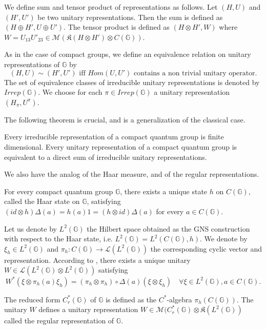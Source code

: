 We define sum and tensor product of representations as follows. Let $(H,U)$ and $(H',U')$ be two unitary representations. Then the sum is defined as $(H\oplus H', U\oplus U')$. The tensor product is defined as $(H\otimes H',W)$ where $W = U_{13} U'_{23}\in \mathcal M(\mathfrak K(H\otimes H')\otimes C(\mathbb G))$. 

\begin{definition}
As in the case of compact groups, we define an equivalence relation on unitary representations of $\mathbb G$ by 
\[(H,U)\sim (H',U') \text{ iff } Hom(U,U') \text{ contains a non trivial unitary operator}.\]
The set of equivalence classes of irreducible unitary representations is denoted by $Irrep(\mathbb G)$. We choose for each $\pi\in Irrep (\mathbb G)$ a unitary representation $(H_\pi, U^{\pi})$. 
\end{definition}

The following theorem is crucial, and is a generalization of the classical case. 

\begin{thm} Every irreducible representation of a compact quantum group is finite dimensional. Every unitary representation of a compact quantum group is equivalent to a direct sum of irreducible unitary representations. 
\end{thm}
 
We also have the analog of the Haar measure, and of the regular representations.

\begin{prop}
For every compact quantum group $\mathbb G$, there exists a unique state $h$ on $C(\mathbb G)$, called the Haar state on $\mathbb G$, satisfying $(id\otimes h)\Delta(a) = h(a)1 = (h\otimes id)\Delta(a)$ for every $a\in C(\mathbb G)$. 
\end{prop}

Let us denote by $L^2(\mathbb G)$ the Hilbert space obtained as the GNS construction with respect to the Haar state, i.e. $L^2(\mathbb G) = L^2(C(\mathbb G),h)$. We denote by $\xi_h\in L^2(\mathbb G)$ and $\pi_h : C(\mathbb G)\rightarrow \mathcal L(L^2(\mathbb G))$ the corresponding cyclic vector and representation. According to \cite{Wo}, there exists a unique unitary $W\in \mathcal L(L^2(\mathbb G) \otimes L^2(\mathbb G) )$ satisfying 
\[W^*(\xi\otimes \pi_h(a)\xi_h ) = (\pi_h\otimes\pi_h)\circ \Delta(a)(\xi\otimes \xi_h)\quad \forall \xi\in L^2(\mathbb G),a\in C(\mathbb G).\] 

\begin{definition}
The reduced form $C_r^*(\mathbb G)$ of $\mathbb G$ is defined as the $C^*$-algebra $\pi_h(C(\mathbb G))$. The unitary $W$ defines a unitary representation $W\in\mathcal M(C_r^*(\mathbb G)\otimes \mathfrak K(L^2(\mathbb G))$ called the regular representation of $\mathbb G$.
\end{definition}

